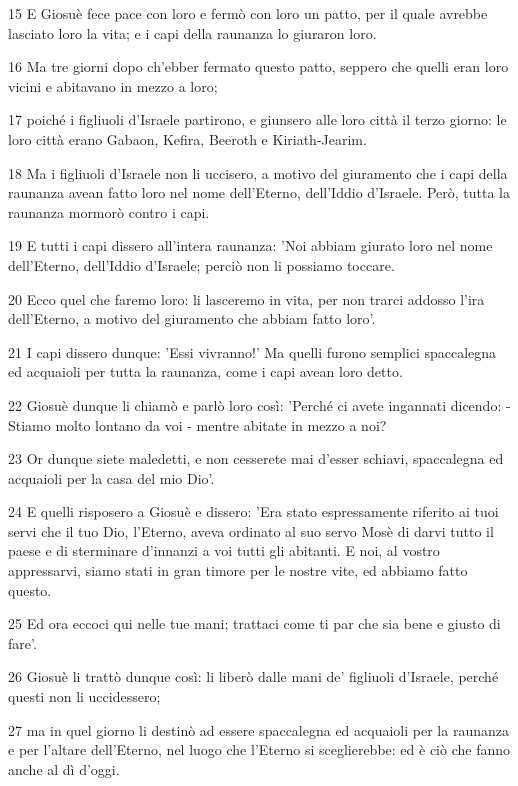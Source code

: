 \par 15 E Giosuè fece pace con loro e fermò con loro un patto, per il quale avrebbe lasciato loro la vita; e i capi della raunanza lo giuraron loro.
\par 16 Ma tre giorni dopo ch'ebber fermato questo patto, seppero che quelli eran loro vicini e abitavano in mezzo a loro;
\par 17 poiché i figliuoli d'Israele partirono, e giunsero alle loro città il terzo giorno: le loro città erano Gabaon, Kefira, Beeroth e Kiriath-Jearim.
\par 18 Ma i figliuoli d'Israele non li uccisero, a motivo del giuramento che i capi della raunanza avean fatto loro nel nome dell'Eterno, dell'Iddio d'Israele. Però, tutta la raunanza mormorò contro i capi.
\par 19 E tutti i capi dissero all'intera raunanza: 'Noi abbiam giurato loro nel nome dell'Eterno, dell'Iddio d'Israele; perciò non li possiamo toccare.
\par 20 Ecco quel che faremo loro: li lasceremo in vita, per non trarci addosso l'ira dell'Eterno, a motivo del giuramento che abbiam fatto loro'.
\par 21 I capi dissero dunque: 'Essi vivranno!' Ma quelli furono semplici spaccalegna ed acquaioli per tutta la raunanza, come i capi avean loro detto.
\par 22 Giosuè dunque li chiamò e parlò loro così: 'Perché ci avete ingannati dicendo: - Stiamo molto lontano da voi - mentre abitate in mezzo a noi?
\par 23 Or dunque siete maledetti, e non cesserete mai d'esser schiavi, spaccalegna ed acquaioli per la casa del mio Dio'.
\par 24 E quelli risposero a Giosuè e dissero: 'Era stato espressamente riferito ai tuoi servi che il tuo Dio, l'Eterno, aveva ordinato al suo servo Mosè di darvi tutto il paese e di sterminare d'innanzi a voi tutti gli abitanti. E noi, al vostro appressarvi, siamo stati in gran timore per le nostre vite, ed abbiamo fatto questo.
\par 25 Ed ora eccoci qui nelle tue mani; trattaci come ti par che sia bene e giusto di fare'.
\par 26 Giosuè li trattò dunque così: li liberò dalle mani de' figliuoli d'Israele, perché questi non li uccidessero;
\par 27 ma in quel giorno li destinò ad essere spaccalegna ed acquaioli per la raunanza e per l'altare dell'Eterno, nel luogo che l'Eterno si sceglierebbe: ed è ciò che fanno anche al dì d'oggi.

